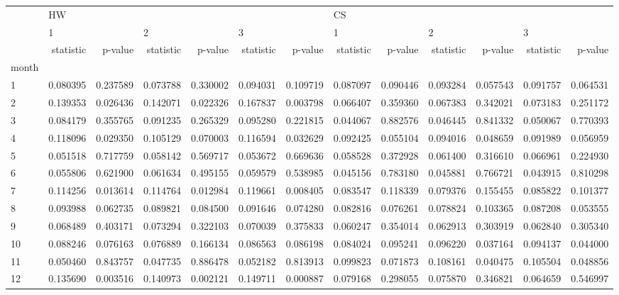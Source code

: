 \begin{tabular}{lrrrrrrrrrrrr}
\toprule
{} & \multicolumn{6}{l}{HW} & \multicolumn{6}{l}{CS} \\
{} & \multicolumn{2}{l}{1} & \multicolumn{2}{l}{2} & \multicolumn{2}{l}{3} & \multicolumn{2}{l}{1} & \multicolumn{2}{l}{2} & \multicolumn{2}{l}{3} \\
{} & statistic &   p-value & statistic &   p-value & statistic &   p-value & statistic &   p-value & statistic &   p-value & statistic &   p-value \\
month &           &           &           &           &           &           &           &           &           &           &           &           \\
\midrule
1     &  0.080395 &  0.237589 &  0.073788 &  0.330002 &  0.094031 &  0.109719 &  0.087097 &  0.090446 &  0.093284 &  0.057543 &  0.091757 &  0.064531 \\
2     &  0.139353 &  0.026436 &  0.142071 &  0.022326 &  0.167837 &  0.003798 &  0.066407 &  0.359360 &  0.067383 &  0.342021 &  0.073183 &  0.251172 \\
3     &  0.084179 &  0.355765 &  0.091235 &  0.265329 &  0.095280 &  0.221815 &  0.044067 &  0.882576 &  0.046445 &  0.841332 &  0.050067 &  0.770393 \\
4     &  0.118096 &  0.029350 &  0.105129 &  0.070003 &  0.116594 &  0.032629 &  0.092425 &  0.055104 &  0.094016 &  0.048659 &  0.091989 &  0.056959 \\
5     &  0.051518 &  0.717759 &  0.058142 &  0.569717 &  0.053672 &  0.669636 &  0.058528 &  0.372928 &  0.061400 &  0.316610 &  0.066961 &  0.224930 \\
6     &  0.055806 &  0.621900 &  0.061634 &  0.495155 &  0.059579 &  0.538985 &  0.045156 &  0.783180 &  0.045881 &  0.766721 &  0.043915 &  0.810298 \\
7     &  0.114256 &  0.013614 &  0.114764 &  0.012984 &  0.119661 &  0.008405 &  0.083547 &  0.118339 &  0.079376 &  0.155455 &  0.085822 &  0.101377 \\
8     &  0.093988 &  0.062735 &  0.089821 &  0.084500 &  0.091646 &  0.074280 &  0.082816 &  0.076261 &  0.078824 &  0.103365 &  0.087208 &  0.053555 \\
9     &  0.068489 &  0.403171 &  0.073294 &  0.322103 &  0.070039 &  0.375833 &  0.060247 &  0.354014 &  0.062913 &  0.303919 &  0.062840 &  0.305340 \\
10    &  0.088246 &  0.076163 &  0.076889 &  0.166134 &  0.086563 &  0.086198 &  0.084024 &  0.095241 &  0.096220 &  0.037164 &  0.094137 &  0.044000 \\
11    &  0.050460 &  0.843757 &  0.047735 &  0.886478 &  0.052182 &  0.813913 &  0.099823 &  0.071873 &  0.108161 &  0.040475 &  0.105504 &  0.048856 \\
12    &  0.135690 &  0.003516 &  0.140973 &  0.002121 &  0.149711 &  0.000887 &  0.079168 &  0.298055 &  0.075870 &  0.346821 &  0.064659 &  0.546997 \\
\bottomrule
\end{tabular}
